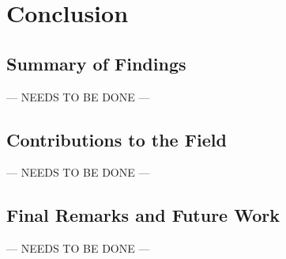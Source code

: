 \section{Conclusion}

\subsection{Summary of Findings}
\label{sec:Summary of Findings}

--- NEEDS TO BE DONE ---

\subsection{Contributions to the Field}
\label{sec:Contributions to the Field}

--- NEEDS TO BE DONE ---

\subsection{Final Remarks and Future Work}
\label{sec:Final Remarks and Future Work}

--- NEEDS TO BE DONE ---